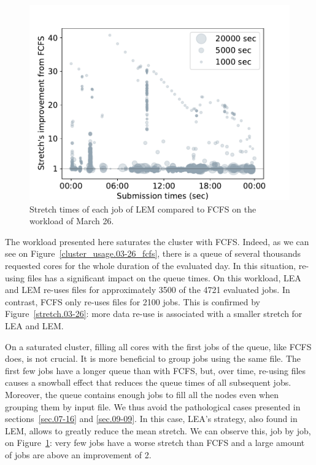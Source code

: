 \documentclass[conference,10pt]{IEEEtran}
\begin{document}
\begin{figure}[t]\centering\includegraphics[width=0.9\linewidth]{../MBSS/plot/Stretch_times/Stretch_times_FCFS_LEM_2022-03-26->2022-03-26_V10000_450_128_32_256_4_1024.pdf}\caption{Stretch times of each job of LEM compared to FCFS on the workload of March 26.}\label{vs_fcfs_lem_03-26}\end{figure}

The workload presented here saturates the cluster with FCFS. 
Indeed, as we can see on Figure~\ref{cluster_usage.03-26_fcfs}, there is
a queue of several thousands requested cores
for the whole duration of the evaluated day.
In this situation, re-using files has a significant impact
on the queue times. 
On this workload, LEA and LEM re-uses files for approximately 3500
of the 4721 evaluated jobs. In contrast, FCFS only re-uses files for 2100 jobs.
This is confirmed by Figure~\ref{stretch.03-26}:
more data re-use is associated with a smaller stretch for LEA and LEM.

On a saturated cluster, filling all cores with the first jobs of the queue, like FCFS does, is not crucial.
It is more beneficial to group jobs using the same file.
The first few jobs have a longer queue than with FCFS,
but, over time, re-using files causes a snowball effect that reduces the 
queue times of all subsequent jobs.
Moreover, the queue contains enough jobs to fill all the nodes even when grouping them by input file.
We thus avoid the pathological cases presented in sections~\ref{sec.07-16} and \ref{sec.09-09}.
In this case, LEA's strategy, also found in LEM, allows to greatly reduce the mean stretch.
We can observe this, job by job, on Figure~\ref{vs_fcfs_lem_03-26}: very few jobs 
have a worse stretch than FCFS and a large amount of jobs are above an improvement of 2. 
\end{document}
